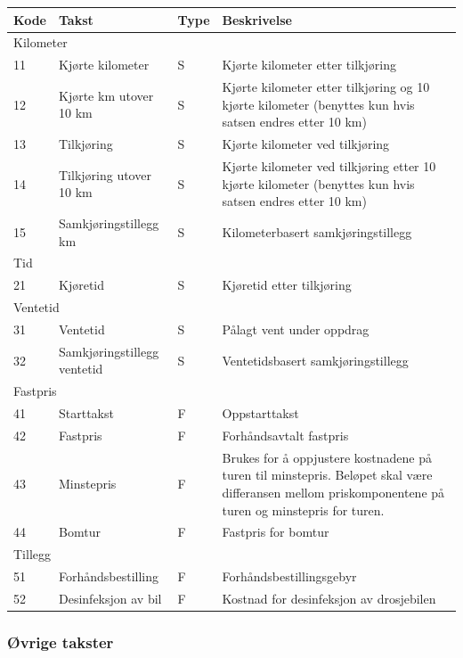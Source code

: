 \documentclass[a4paper,titlepage,norsk,11pt]{article}
\begin{document}
\begin{tabularx}{\textwidth}{|l|l|l|X|}
\hline
\textbf{Kode} & \textbf{Takst} & \textbf{Type} & \textbf{Beskrivelse} \\\hline
\multicolumn{4}{|l|}{Kilometer} \\\hline
11 & Kjørte kilometer & S & Kjørte kilometer etter tilkjøring \\\hline
12 & Kjørte km utover 10 km & S & Kjørte kilometer etter tilkjøring og 10 kjørte kilometer (benyttes kun hvis satsen endres etter 10 km) \\\hline
13 & Tilkjøring & S & Kjørte kilometer ved tilkjøring \\\hline
14 & Tilkjøring utover 10 km & S & Kjørte kilometer ved tilkjøring etter 10 kjørte kilometer (benyttes kun hvis satsen endres etter 10 km) \\\hline
15 & Samkjøringstillegg km & S & Kilometerbasert samkjøringstillegg \\\hline
\multicolumn{4}{|l|}{Tid} \\\hline
21 & Kjøretid & S & Kjøretid etter tilkjøring \\\hline
\multicolumn{4}{|l|}{Ventetid} \\\hline
31 & Ventetid & S & Pålagt vent under oppdrag \\\hline
32 & Samkjøringstillegg ventetid & S & Ventetidsbasert samkjøringstillegg  \\\hline
\multicolumn{4}{|l|}{Fastpris} \\\hline
41 & Starttakst & F & Oppstarttakst \\\hline
42 & Fastpris & F & Forhåndsavtalt fastpris \\\hline
43 & Minstepris & F & Brukes for å oppjustere kostnadene på turen til minstepris. Beløpet skal være differansen mellom priskomponentene på turen og minstepris for turen. \\\hline
44 & Bomtur & F & Fastpris for bomtur \\\hline
\multicolumn{4}{|l|}{Tillegg} \\\hline
51 & Forhåndsbestilling & F & Forhåndsbestillingsgebyr \\\hline
52 & Desinfeksjon av bil & F & Kostnad for desinfeksjon av drosjebilen \\\hline
\end{tabularx}

\subsubsection{Øvrige takster}
\end{document}
